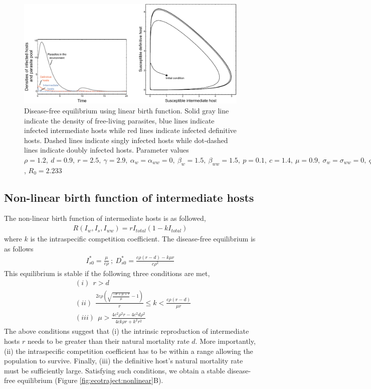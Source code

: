 \documentclass[11pt]{article}
\begin{document}
\begin{figure}
\includegraphics[width=\textwidth]{Figures/diseasefree_linear.pdf}
\caption{Disease-free equilibrium using linear birth function. Solid gray line indicate the density of free-living parasites, blue lines indicate infected intermediate hosts while red lines indicate infected definitive hosts. Dashed lines indicate singly infected hosts while dot-dashed lines indicate doubly infected hosts. Parameter values  $\rho = 1.2, \  d = 0.9, \  r = 2.5, \ \gamma = 2.9, \ \alpha_w =  \alpha_{ww} =  0, \ \beta_w  = 1.5, \ \beta_{ww} = 1.5, \ p = 0.1,  \ c = 1.4, \ \mu = 0.9,  \ \sigma_w = \sigma_{ww} = 0, \ q = 0.01, \  f_w = 6.5, \  f_{ww} = 7.5, \ \delta = 0.9$, $R_0 = 2.233$ } 
\label{fig:diseasefree:linear}
\end{figure}

\subsection*{Non-linear birth function of intermediate hosts}
The non-linear birth function of intermediate hosts is as followed,
\begin{align*}
R(I_w, I_s,I_{ww}) = r I_{total} (1 - k I_{total})
\end{align*}
%
where $k$ is the intraspecific competition coefficient. 
The disease-free equilibrium is as follows
%
\begin{align*}
I_{s0}^* = \frac{\mu}{c \rho } \ ;\  D_{s0}^* = \frac{c \rho  (r-d) - k \mu  r}{c \rho ^2}
\end{align*}
%
This equilibrium is stable if the following three conditions are met,
%
\begin{align*}
& (i)\ \  r > d \\
& (ii)\ \  \frac{2 c \rho  \left(\sqrt{\frac{-d+\mu +r}{\mu }}-1\right)}{r}\leq  k < \frac{c \rho  (r-d)}{\mu  r} \\
& (iii)\ \  \mu  >\frac{4 c^2 \rho ^2 r - 4 c^2 d \rho ^2}{4 c k \rho r + k^2 r^2}
\end{align*}
%
The above conditions suggest that (i) the intrinsic reproduction of intermediate hosts $r$ needs to be greater than their natural mortality rate $d$. 
More importantly, (ii) the intraspecific competition coefficient has to be within a range allowing the population to survive.
Finally, (iii) the definitive host's natural mortality rate must be sufficiently large. 
Satisfying such conditions, we obtain a stable disease-free equilibrium (Figure \ref{fig:ecotraject:nonlinear}B).
\end{document}
